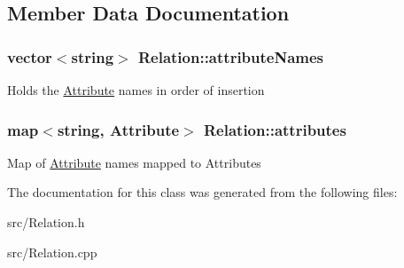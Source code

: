 \subsection{Member Data Documentation}
\hypertarget{class_relation_ace8c91beafd208dcf6469b9b2425ecf7}{
\subsubsection[{attribute\-Names}]{\setlength{\rightskip}{0pt plus 5cm}vector$<$string$>$ Relation\-::attribute\-Names\hspace{0.3cm}{\ttfamily [private]}}}\label{class_relation_ace8c91beafd208dcf6469b9b2425ecf7}
Holds the \hyperlink{class_attribute}{Attribute} names in order of insertion \hypertarget{class_relation_ad505b043cf529432345433e6d4e2ded9}{
\subsubsection[{attributes}]{\setlength{\rightskip}{0pt plus 5cm}map$<$string, {\bf Attribute}$>$ Relation\-::attributes\hspace{0.3cm}{\ttfamily [private]}}}\label{class_relation_ad505b043cf529432345433e6d4e2ded9}
Map of \hyperlink{class_attribute}{Attribute} names mapped to Attributes 

The documentation for this class was generated from the following files\-:\begin{DoxyCompactItemize}
\item 
src/Relation.\-h\item 
src/Relation.\-cpp\end{DoxyCompactItemize}
